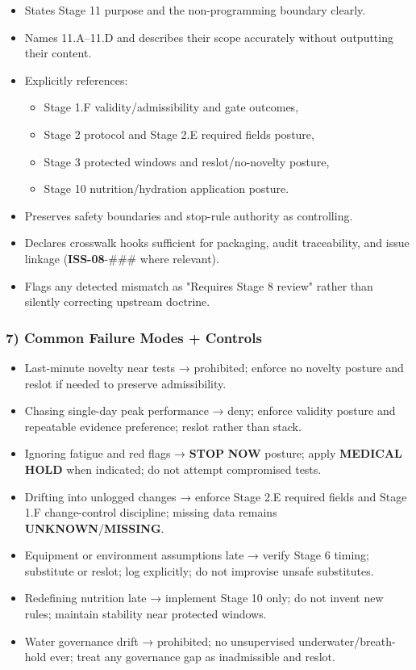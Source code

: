\documentclass[10pt]{article}
\begin{document}
\begin{itemize}
\item States Stage 11 purpose and the non-programming boundary clearly.
\item Names 11.A–11.D and describes their scope accurately without outputting their content.
\item Explicitly references:
\begin{itemize}
\item Stage 1.F validity/admissibility and gate outcomes,
\item Stage 2 protocol and Stage 2.E required fields posture,
\item Stage 3 protected windows and reslot/no-novelty posture,
\item Stage 10 nutrition/hydration application posture.
\end{itemize}
\item Preserves safety boundaries and stop-rule authority as controlling.
\item Declares crosswalk hooks sufficient for packaging, audit traceability, and issue linkage (\textbf{ISS-08}-### where relevant).
\item Flags any detected mismatch as "Requires Stage 8 review" rather than silently correcting upstream doctrine.
\end{itemize}

\subsubsection*{7) Common Failure Modes + Controls}

\begin{itemize}
\item Last-minute novelty near tests → prohibited; enforce no novelty posture and reslot if needed to preserve admissibility.
\item Chasing single-day peak performance → deny; enforce validity posture and repeatable evidence preference; reslot rather than stack.
\item Ignoring fatigue and red flags → \textbf{STOP} \textbf{NOW} posture; apply \textbf{MEDICAL} \textbf{HOLD} when indicated; do not attempt compromised tests.
\item Drifting into unlogged changes → enforce Stage 2.E required fields and Stage 1.F change-control discipline; missing data remains \textbf{UNKNOWN}/\textbf{MISSING}.
\item Equipment or environment assumptions late → verify Stage 6 timing; substitute or reslot; log explicitly; do not improvise unsafe substitutes.
\item Redefining nutrition late → implement Stage 10 only; do not invent new rules; maintain stability near protected windows.
\item Water governance drift → prohibited; no unsupervised underwater/breath-hold ever; treat any governance gap as inadmissible and reslot.
\end{itemize}
\end{document}

